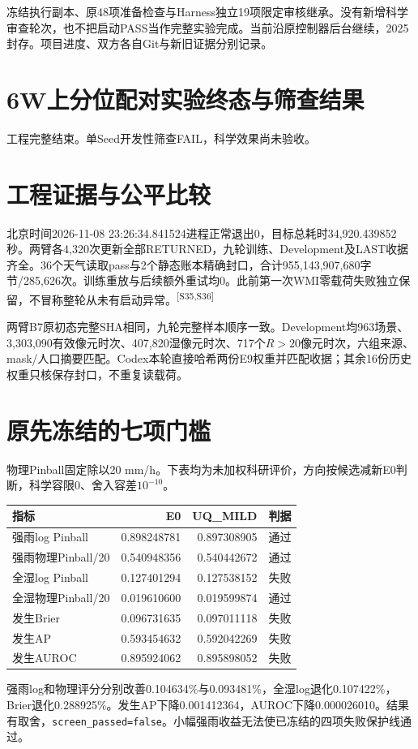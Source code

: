 \documentclass[UTF8,10.5pt,a4paper,fontset=none]{ctexart}
\newcommand{\evi}[1]{\textsuperscript{\color{muted}[#1]}}
\newcommand{\pageheading}[2]{\clearpage\section*{#1}\textcolor{muted}{#2}\par\vspace{3pt}}
\begin{document}
冻结执行副本、原48项准备检查与Harness独立19项限定审核继承。没有新增科学审查轮次，也不把启动PASS当作完整实验完成。当前沿原控制器后台继续，2025封存。项目进度、双方各自Git与新旧证据分别记录。

\pageheading{6W\quad 上分位配对实验终态与筛查结果}{工程完整结束。单Seed开发性筛查FAIL，科学效果尚未验收。}
\section*{工程证据与公平比较}
北京时间2026-11-08 23:26:34.841524进程正常退出0，目标总耗时34,920.439852秒。两臂各4,320次更新全部RETURNED，九轮训练、Development及LAST收据齐全。36个天气读取pass与2个静态账本精确封口，合计955,143,907,680字节/285,626次。训练重放与后续额外重试均0。此前第一次WMI零载荷失败独立保留，不冒称整轮从未有启动异常。\evi{S35,S36}

两臂B7原初态完整SHA相同，九轮完整样本顺序一致。Development均963场景、3,303,090有效像元时次、407,820湿像元时次、717个$R>20$像元时次，六组来源、mask/人口摘要匹配。Codex本轮直接哈希两份E9权重并匹配收据；其余16份历史权重只核保存封口，不重复读载荷。

\section*{原先冻结的七项门槛}
物理Pinball固定除以20 mm/h。下表均为未加权科研评价，方向按候选减新E0判断，科学容限0、舍入容差$10^{-10}$。

\begin{tabularx}{\textwidth}{@{}Xrrl@{}}
\toprule 指标 & E0 & UQ\_MILD & 判据\\\midrule
强雨log Pinball & 0.898248781 & 0.897308905 & 通过\\
强雨物理Pinball/20 & 0.540948356 & 0.540442672 & 通过\\
全湿log Pinball & 0.127401294 & 0.127538152 & 失败\\
全湿物理Pinball/20 & 0.019610600 & 0.019599874 & 通过\\
发生Brier & 0.096731635 & 0.097011118 & 失败\\
发生AP & 0.593454632 & 0.592042269 & 失败\\
发生AUROC & 0.895924062 & 0.895898052 & 失败\\\bottomrule
\end{tabularx}

强雨log和物理评分分别改善0.104634\%与0.093481\%，全湿log退化0.107422\%，Brier退化0.288925\%。发生AP下降0.001412364，AUROC下降0.000026010。结果有取舍，\texttt{screen\_passed=false}。小幅强雨收益无法使已冻结的四项失败保护线通过。
\end{document}

